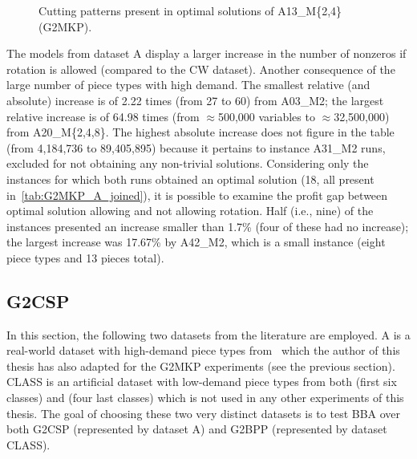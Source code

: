 \begin{figure}[!t]
  \caption{Cutting patterns present in optimal solutions of A13\_M\{2,4\} (G2MKP).}
  \center
  
  \label{fig:g2mkp_a14_24}
\end{figure}

The models from dataset A display a larger increase in the number of nonzeros if rotation is allowed (compared to the CW dataset).
Another consequence of the large number of piece types with high demand.
The smallest relative (and absolute) increase is of 2.22 times (from 27 to 60) from A03\_M2; the largest relative increase is of 64.98 times (from \(\approx\)500,000 variables to \(\approx\)32,500,000) from A20\_M\{2,4,8\}.
The highest absolute increase does not figure in the table (from 4,184,736 to 89,405,895) because it pertains to instance A31\_M2 runs, excluded for not obtaining any non-trivial solutions.
Considering only the instances for which both runs obtained an optimal solution (18, all present in~\cref{tab:G2MKP_A_joined}), it is possible to examine the profit gap between optimal solution allowing and not allowing rotation.
Half (i.e., nine) of the instances presented an increase smaller than 1.7\% (four of these had no increase); the largest increase was 17.67\% by A42\_M2, which is a small instance (eight piece types and 13 pieces total).

\subsection{G2CSP}

In this section, the following two datasets from the literature are employed.
A is a real-world dataset with high-demand piece types from~\citet{macedo:2010} which the author of this thesis has also adapted for the G2MKP experiments (see the previous section).
CLASS is an artificial dataset with low-demand piece types from both \citet{berkey:1987} (first six classes) and \citet{fayard:1998} (four last classes) which is not used in any other experiments of this thesis.
The goal of choosing these two very distinct datasets is to test BBA over both G2CSP (represented by dataset A) and G2BPP (represented by dataset CLASS).


